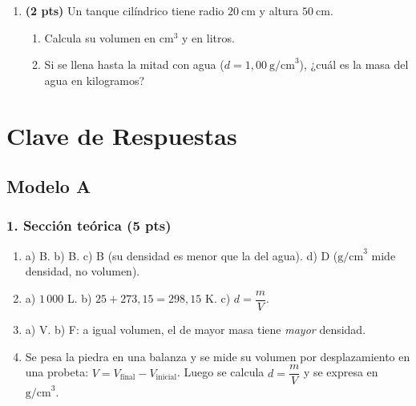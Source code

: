 \documentclass[12pt, letterpaper]{article}
\begin{document}
\begin{enumerate}[leftmargin=*, label=\textbf{\arabic*.}, itemsep=1.0em]
  \item \textbf{(2 pts)} Un tanque cilíndrico tiene radio $20\ \text{cm}$ y
        altura $50\ \text{cm}$.
        \begin{enumerate}[label=\alph*), leftmargin=1.8em, itemsep=0.3em]
          \item Calcula su volumen en $\text{cm}^3$ y en litros.
          \item Si se llena hasta la mitad con agua ($d=1{,}00\ \text{g/cm}^3$),
                ¿cuál es la masa del agua en kilogramos?
        \end{enumerate}
        \vspace{1.8cm}
\end{enumerate}

\newpage
\ifmwclaves
\section{Clave de Respuestas}

\subsection*{Modelo A}

\subsubsection*{1. Sección teórica (5 pts)}
\begin{enumerate}[leftmargin=*, label=\textbf{\arabic*.}, itemsep=0.35em]
  \item a) B. \quad b) B. \quad c) B (su densidad es menor que la del agua). \quad
        d) D ($\text{g/cm}^3$ mide densidad, no volumen).
  \item a) $1\,000$ L. \quad b) $25+273{,}15=298{,}15$ K. \quad
        c) $d=\dfrac{m}{V}$.
  \item a) V. \quad b) F: a igual volumen, el de mayor masa tiene \emph{mayor} densidad.
  \item Se pesa la piedra en una balanza y se mide su volumen por desplazamiento
        en una probeta: $V=V_{\text{final}}-V_{\text{inicial}}$. Luego se calcula
        $d=\dfrac{m}{V}$ y se expresa en $\text{g/cm}^3$.
\end{enumerate}
\end{document}
